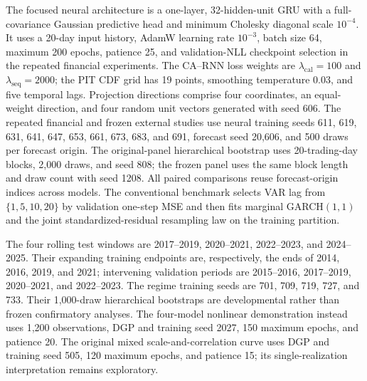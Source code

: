 \documentclass[11pt]{article}
\begin{document}
The focused neural architecture is a one-layer, 32-hidden-unit GRU with a
full-covariance Gaussian predictive head and minimum Cholesky diagonal scale
$10^{-4}$. It uses a 20-day input history, AdamW learning rate $10^{-3}$,
batch size 64, maximum 200 epochs, patience 25, and validation-NLL checkpoint
selection in the repeated financial experiments. The CA--RNN loss weights are
$\lambda_{\mathrm{cal}}=100$ and $\lambda_{\mathrm{seq}}=2000$; the PIT CDF grid has
19 points, smoothing temperature 0.03, and five temporal lags. Projection
directions comprise four coordinates, an equal-weight direction, and four
random unit vectors generated with seed 606. The repeated financial and frozen
external studies use neural training seeds 611, 619, 631, 641, 647, 653, 661,
673, 683, and 691, forecast seed 20,606, and 500 draws per forecast origin.
The original-panel hierarchical bootstrap uses 20-trading-day blocks, 2,000
draws, and seed 808; the frozen panel uses the same block length and draw count
with seed 1208. All paired comparisons reuse forecast-origin indices across
models. The conventional benchmark selects VAR lag from $\{1,5,10,20\}$ by
validation one-step MSE and then fits marginal GARCH$(1,1)$ and the joint
standardized-residual resampling law on the training partition.

The four rolling test windows are 2017--2019, 2020--2021, 2022--2023, and
2024--2025. Their expanding training endpoints are, respectively, the ends of
2014, 2016, 2019, and 2021; intervening validation periods are 2015--2016,
2017--2019, 2020--2021, and 2022--2023. The regime training seeds are
701, 709, 719, 727, and 733. Their
1,000-draw hierarchical bootstraps are developmental rather than frozen
confirmatory analyses. The four-model nonlinear demonstration instead uses
1,200 observations, DGP and training seed 2027, 150 maximum epochs, and patience
20. The original mixed scale-and-correlation curve uses DGP and training seed
505, 120 maximum epochs, and patience 15; its single-realization interpretation
remains exploratory.
\end{document}
